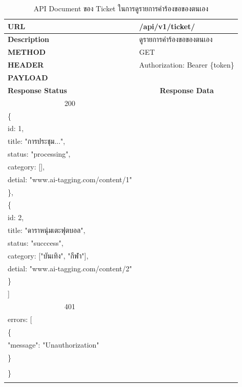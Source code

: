 \documentclass[12pt,oneside,openright,a4paper]{cpe-thai-project}
\begin{document}
\begin{longtable}[!ht]{p{3cm}|p{8cm}}
  \caption{API Document ของ Ticket ในการดูรายการคำร้องขอของตนเอง}\label{tbl:api_ticket} 
    \endfirsthead
    \endhead
    \hhline{==}  
    \textbf{URL}              & /api/v1/ticket/                                                                                             \\ \hline
    \textbf{Description}      & ดูรายการคำร้องขอของตนเอง                                                                                     \\ \hline
    \textbf{METHOD}           & GET                                                                                                                 \\ \hline
    \textbf{HEADER}           & Authorization: Bearer \{token\}                                                                                         \\ \hline
    \textbf{PAYLOAD}          &   \\ \hline \newpage \hline
    \textbf{Response Status}  & \multicolumn{1}{c}{\textbf{Response Data}}                                                                          \\ \hline
    \multicolumn{1}{c|}{200}  &
    \begin{tabular}[c]{@{}l@{}}{[}\\ \quad\{\\ \quad\quad id: 1,\\ \quad\quad title: "การประชุม...",\\\quad\quad status: "processing",\\ 
      \quad\quad category: {[}{]},\\ \quad\quad detial: "www.ai-tagging.com/content/1"\\ \quad\},\\ 
      \quad\{\\ \quad\quad id: 2,\\ \quad\quad title: "ดาราหนุ่มเตะฟุตบอล",\\\quad\quad status: "succcess",\\ 
      \quad\quad category: {[}"บันเทิง", "กีฬา"{]},\\ \quad\quad detial: "www.ai-tagging.com/content/2"\\ \quad \}\\{]}\end{tabular}  \\ \hline
    \multicolumn{1}{c|}{401}  &
    \begin{tabular}[c]{@{}l@{}}\{\\ \quad errors: {[}\\ \quad\quad\{\\ \quad\quad\quad"message": "Unauthorization"\\ \quad\quad\}\\\quad {]}\\ \}\end{tabular}                                                                         \\ \hline
    \hhline{==}
\end{longtable}
\end{document}
